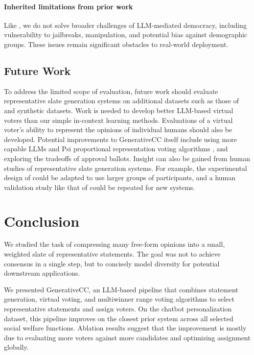 \documentclass[letterpaper]{article} %
\begin{document}
\paragraph{Inherited limitations from prior work}
Like \citet{fish-v2}, we do not solve broader challenges of LLM-mediated democracy, including vulnerability to jailbreaks, manipulation, and potential bias against demographic groups.
These issues remain significant obstacles to real-world deployment.

\subsection{Future Work}

To address the limited scope of evaluation, future work should evaluate representative slate generation systems on additional datasets such as those of \citet{gsc-next-gen} and synthetic datasets.
Work is needed to develop better LLM-based virtual voters than our simple in-context learning methods.
Evaluations of a virtual voter's ability to represent the opinions of individual humans should also be developed.
Potential improvements to GenerativeCC itself include using more capable LLMs and Psi proportional representation voting algorithms \citep{rangevoting-optimal-pr}, and exploring the tradeoffs of approval ballots.
Insight can also be gained from human studies of representative slate generation systems.
For example, the experimental design of \citet{habermas-machine} could be adapted to use larger groups of participants, and a human validation study like that of \citet{fish-v2} could be repeated for new systems.

\section{Conclusion}

We studied the task of compressing many free-form opinions into a small, weighted slate of representative statements.
The goal was not to achieve consensus in a single step, but to concisely model diversity for potential downstream applications.

We presented GenerativeCC, an LLM-based pipeline that combines statement generation, virtual voting, and multiwinner range voting algorithms to select representative statements and assign voters.
On the chatbot personalization dataset, this pipeline improves on the closest prior system across all selected social welfare functions.
Ablation results suggest that the improvement is mostly due to evaluating more voters against more candidates and optimizing assignment globally.
\end{document}
